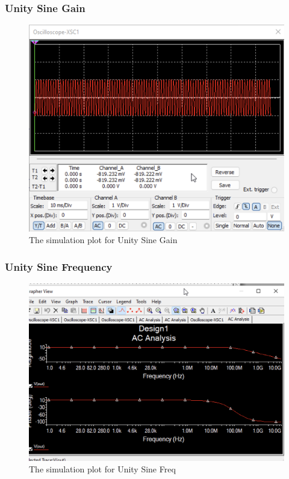 \documentclass{article}
\begin{document}
	\subsubsection{Unity Sine Gain}
	\begin{figure}[H]
		\centering
		\includegraphics[width=1\textwidth]{Unity/UnitySineGain.png}
		\caption{The simulation plot for Unity Sine Gain}
		\label{fig:UnitySineGain}
	\end{figure}
	\subsubsection{Unity Sine Frequency}
	\begin{figure}[H]
	\centering
	\includegraphics[width=1\textwidth]{Unity/UnitySineFreq.png}
	\caption{The simulation plot for Unity Sine Freq}
	\label{fig:UnitySineFreq}
	\end{figure}
	
\end{document}
